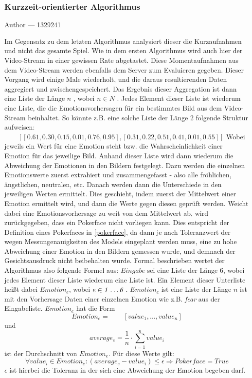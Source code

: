 \documentclass[12pt, a4paper]{report}
\makeatletter
\newcommand{\sectionauthor}[1]{%
  {\parindent0pt\vspace*{-5pt}%
  \large{Author --- }
  \linespread{1.1}\large\scshape#1%
  \par\nobreak\vspace*{35pt} }
  \@afterheading%
}
\makeatother
\begin{document}
\subsubsection{Kurzzeit-orientierter Algorithmus}
\sectionauthor{1329241}
Im Gegensatz zu dem letzten Algorithmus analysiert dieser die Kurzaufnahmen und nicht das gesamte Spiel. 
Wie in dem ersten Algorithmus wird auch hier der Video-Stream in einer gewissen Rate abgetastet. Diese Momentaufnahmen aus dem Video-Stream werden ebenfalls dem Server zum Evaluieren gegeben. Dieser Vorgang wird einige Male wiederholt, und die daraus resultierenden Daten aggregiert und zwischengespeichert. Das Ergebnis dieser Aggregation ist dann eine Liste der Länge 
$ n $  , wobei $ n \in N $
. Jedes Element dieser Liste ist wiederum eine Liste, die die Emotionsvorhersagen für ein bestimmtes Bild aus dem Video-Stream beinhaltet. So könnte z.B. eine solche Liste der Länge 2 folgende Struktur aufweisen: \newline
$ \qquad[ [0.61, 0.30, 0.15, 0.01, 0.76, 0.95] , [0.31, 0.22, 0.51, 0.41, 0.01, 0.55] ] $
Wobei jeweils ein Wert für eine Emotion steht bzw. die Wahrscheinlichkeit einer Emotion für das jeweilige Bild. Anhand dieser Liste wird dann wiederum die Abweichung der Emotionen in den Bildern festgelegt. Dazu werden die einzelnen Emotionswerte zuerst extrahiert und zusammengefasst - also alle fröhlichen, ängstlichen, neutralen, etc. Danach werden dann die Unterschiede in den jeweiligen Werten ermittelt.
Dies geschieht, indem zuerst der Mittelwert einer Emotion ermittelt wird, und dann die Werte gegen diesen geprüft werden. Weicht dabei eine Emotionsvorhersage zu weit von dem Mittelwert ab, wird zurückgegeben, dass ein Pokerface nicht vorliegen kann. Dies entspricht der Definition eines Pokerfaces in \ref{pokerface}, da dann je nach Toleranzwert der  wegen Messungenauigkeiten des Models eingeplant werden muss, eine zu hohe Abweichung einer Emotion in den Bildern gemessen wurde, und demnach der Gesichtsausdruck nicht beibehalten wurde.
Formal beschrieben wertet der Algorithmus also folgende Formel aus: \newline \newline
$ Eingabe $  sei eine Liste der Länge $ 6 $, wobei jedes Element dieser Liste wiederum eine Liste ist. Ein Element dieser Unterliste heißt dabei
 $ Emotion_{e} $, wobei $ e \in {\textit{1 \dots 6 }} $. $Emotion_{e}$ ist eine Liste der Länge $ n $ ist mit den Vorhersage Daten einer einzelnen Emotion wie z.B. \textit{fear} aus der Eingabeliste. $Emotion_{e}$ hat die Form $$ Emotion_{e} = \qquad [value_{1}, \dots ,value_{n}] $$ 
und 
$$average_{e} =\frac{1}{n} \cdot \sum_{i = 1}^{n} value_{i} $$
ist der Durchschnitt von $ Emotion_{e} $.
Für diese Werte gilt:
\newline $$ \forall value_{i} \in Emotion_{e} : (average_{e} - value_{i}) \leq \epsilon \Rightarrow Pokerface = True $$
 $ \epsilon$ ist hierbei die Toleranz in der sich eine Abweichung der Emotion begeben darf.
\end{document}
